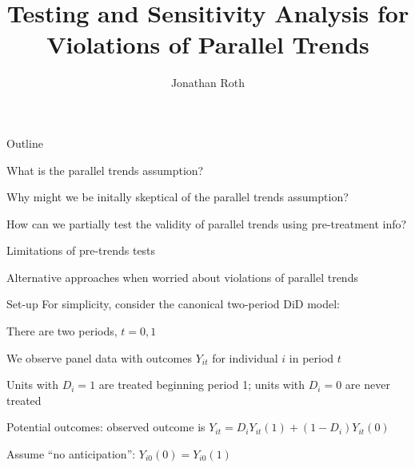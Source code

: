 \documentclass[aspectratio = 169, 13pt]{beamer}
\author{Jonathan Roth}
\title[Pre-trends testing]{Testing and Sensitivity Analysis for Violations of Parallel Trends}
\begin{document}
\maketitle	


\begin{frame}{Outline}
	\begin{wideitemize}
		\item
		What is the parallel trends assumption? 
		
		\item
		Why might we be initally skeptical of the parallel trends assumption? 
		
		\item
		How can we partially test the validity of parallel trends using pre-treatment info? 
		
		\item
		Limitations of pre-trends tests
		
		\item
		Alternative approaches when worried about violations of parallel trends
	\end{wideitemize}
\end{frame}

\begin{frame}{Set-up}
For simplicity, consider the canonical two-period DiD model:
\medskip
\begin{wideitemize}
	\item
	There are two periods, $t=0,1$
	
	\item
	We observe panel data with outcomes $Y_{it}$ for individual $i$ in period $t$
	
	\item
	Units with $D_i=1$ are treated beginning period 1; units with $D_i=0$ are never treated
	
	\item
	Potential outcomes: observed outcome is $Y_{it} = D_i Y_{it}(1) + (1-D_i) Y_{it}(0)$
	
	\item
	Assume ``no anticipation'': $Y_{i0}(0) = Y_{i0}(1)$
\end{wideitemize}
\end{frame}
\end{document}

